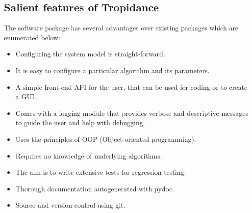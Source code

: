 \documentclass[12pt]{article}
\let\oldref\ref
\renewcommand{\ref}[1]{(\oldref{#1})}
\begin{document}



\subsection{Salient features of Tropidance}

The software package has several advantages over existing packages which are enumerated below:

\begin{itemize}
\item Configuring the system model is straight-forward.
\item It is easy to configure a particular algorithm and its parameters. 
\item A simple front-end API for the user, that can be used for coding or to create a GUI. 
\item Comes with a logging module that provides verbose and descriptive messages to guide the user and help with debugging.
\item Uses the principles of OOP (Object-oriented programming).
\item Requires no knowledge of underlying algorithms.
\item The aim is to write extensive tests for regression testing. 
\item Thorough documentation autogenerated with pydoc. 
\item Source and version control using git.
\end{itemize}








\medskip
\end{document}
